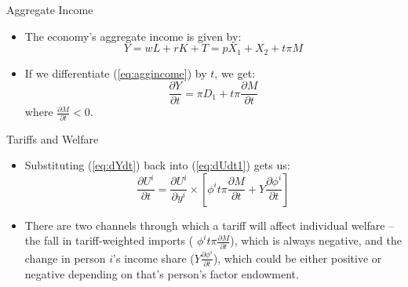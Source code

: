 \documentclass[aspectratio=169]{beamer}
\begin{document}

\begin{frame}{Aggregate Income}

\begin{itemize}
    \item<1-> The economy’s aggregate income is given by:
    \begin{equation}
        Y = wL + rK + T = pX_{1} + X_{2} + t \pi M
        \label{eq:aggincome}
    \end{equation}
    \item<2-> If we differentiate (\ref{eq:aggincome}) by $ t $, we get:
    \begin{equation}
        \frac{\partial Y}{\partial t} = \pi D_{1} + t \pi \frac{\partial M}{\partial t}
        \label{eq:dYdt}
    \end{equation}
    where $ \frac{\partial M}{\partial t} < 0 $.
\end{itemize}
    
\end{frame}


\begin{frame}{Tariffs and Welfare}

\begin{itemize}
    \item<1-> Substituting (\ref{eq:dYdt}) back into (\ref{eq:dUdt1}) gets us:
    \begin{equation}
        \frac{\partial U^{i}}{\partial t} = \frac{\partial U^{i}}{\partial y^{i}} \times \left[ \phi^{i} t \pi \frac{\partial M}{\partial t} + Y \frac{\partial \phi^{i}}{\partial t} \right]
        \label{eq:dUdt2}
    \end{equation}
    \item<2->There are two channels through which a tariff will affect individual welfare – the fall in tariff-weighted imports ( $ \phi^{i} t \pi \frac{\partial M}{\partial t} $), which is always negative, and the change in person $ i $'s income share ($ Y \frac{\partial \phi^{i}}{\partial t} $), which could be either positive or negative depending on that's person's factor endowment.
\end{itemize}
    
\end{frame}

\end{document}
